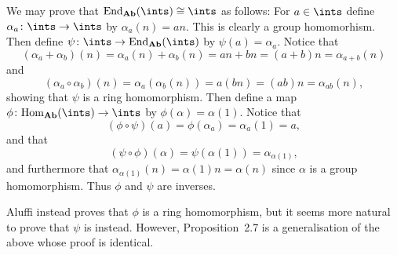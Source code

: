 \documentclass[article, a4paper, 11pt, oneside]{memoir}
\numberwithin{equation}{chapter}
\newcommand{\ncat}[1]{\mathbf{#1}} %
\newcommand{\catAb}{\ncat{Ab}} %
\newcommand{\End}{\mathrm{End}}
\newcommand{\Hom}{\mathrm{Hom}}
\theoremstyle{nonumberplain}
\begin{document}
\begin{remarkbreak}
    We may prove that $\End_\catAb(\ints) \cong \ints$ as follows: For $a \in \ints$ define $\alpha_a \colon \ints \to \ints$ by $\alpha_a(n) = an$. This is clearly a group homomorhism. Then define $\psi \colon \ints \to \End_\catAb(\ints)$ by $\psi(a) = \alpha_a$. Notice that
    \begin{equation*}
        (\alpha_a + \alpha_b)(n)
            = \alpha_a(n) + \alpha_b(n)
            = an + bn
            = (a+b)n
            = \alpha_{a+b}(n)
    \end{equation*}
    and
    \begin{equation*}
        (\alpha_a \circ \alpha_b)(n)
            = \alpha_a (\alpha_b(n))
            = a(bn)
            = (ab)n
            = \alpha_{ab}(n),
    \end{equation*}
    showing that $\psi$ is a ring homomorphism. Then define a map $\phi \colon \Hom_\catAb(\ints) \to \ints$ by $\phi(\alpha) = \alpha(1)$. Notice that
    \begin{equation*}
        (\phi \circ \psi)(a)
            = \phi(\alpha_a)
            = \alpha_a(1)
            = a,
    \end{equation*}
    and that
    \begin{equation*}
        (\psi \circ \phi)(\alpha)
            = \psi(\alpha(1))
            = \alpha_{\alpha(1)},
    \end{equation*}
    and furthermore that $\alpha_{\alpha(1)}(n) = \alpha(1)n = \alpha(n)$ since $\alpha$ is a group homomorphism. Thus $\phi$ and $\psi$ are inverses.

    Aluffi instead proves that $\phi$ is a ring homomorphism, but it seems more natural to prove that $\psi$ is instead. However, Proposition~2.7 is a generalisation of the above whose proof is identical.
\end{remarkbreak}
\end{document}
